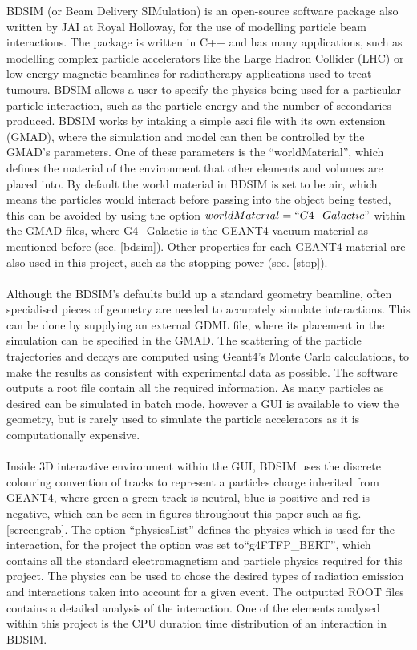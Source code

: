 \documentclass[12pt,a4paper]{article}
\begin{document}
BDSIM (or Beam Delivery SIMulation) \cite{bdsimpap} is an open-source software package also written by JAI at Royal Holloway, for the use of modelling particle beam interactions. The package is written in C++ and has many applications, such as modelling complex particle accelerators like the Large Hadron Collider (LHC) or low energy magnetic beamlines for radiotherapy applications used to treat tumours. BDSIM allows a user to specify the physics being used for a particular particle interaction, such as the particle energy and the number of secondaries produced. BDSIM works by intaking a simple asci file with its own extension (GMAD), where the simulation and model can then be controlled by the GMAD's parameters. One of these parameters is the ``worldMaterial'', which defines the material of the environment that other elements and volumes are placed into. By default the world material in BDSIM is set to be air, which means the particles would interact before passing into the object being tested, this can be avoided by using the option $worldMaterial=``G4\_Galactic"$ within the GMAD files, where G4\_Galactic is the GEANT4 vacuum material as mentioned before (sec. \ref{bdsim}). Other properties for each GEANT4 material are also used in this project, such as the stopping power (sec. \ref{stop}).
\\\\
Although the BDSIM's defaults build up a standard geometry beamline, often specialised pieces of geometry are needed to accurately simulate interactions. This can be done by supplying an external GDML file, where its placement in the simulation can be specified in the GMAD. The scattering of the particle trajectories and decays are computed using Geant4's Monte Carlo calculations, to make the results as consistent with experimental data as possible. The software outputs a root file contain all the required information. As many particles as desired can be simulated in batch mode, however a GUI is available to view the geometry, but is rarely used to simulate the particle accelerators as it is computationally expensive. 
\\\\
Inside 3D interactive environment within the GUI, BDSIM uses the discrete colouring convention of tracks to represent a particles charge inherited from GEANT4, where green a green track is neutral, blue is positive and red is negative, which can be seen in figures throughout this paper such as fig. \ref{screengrab}. The option ``physicsList'' defines the physics which is used for the interaction, for the project the option was set to``g4FTFP\_BERT'', which contains all the standard electromagnetism and particle physics required for this project. The physics can be used to chose the desired types of radiation emission and interactions taken into account for a given event. The outputted ROOT files contains a detailed analysis of the interaction. One of the elements analysed within this project is the CPU duration time distribution of an interaction in BDSIM.
\end{document}
